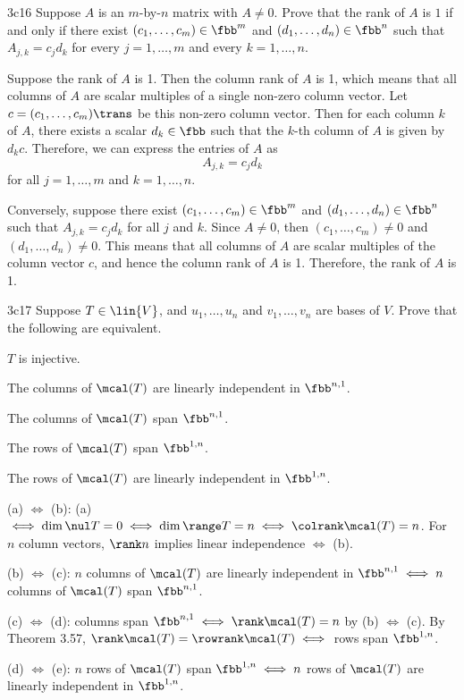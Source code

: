 \begin{exercise}{3c16}
    Suppose $A$ is an $m$-by-$n$ matrix with $A \neq 0$.
	Prove that the rank of $A$ is $1$ if and only if there exist $(c_1, \ldots, c_m) \in \fbb^m$ and $(d_1, \ldots, d_n) \in \fbb^n$ such that $A_{j, k} = c_j d_k$ for every $j = 1, \ldots, m$ and every $k = 1, \ldots, n$.
\end{exercise}

\begin{sol}
    Suppose the rank of $A$ is 1.
	Then the column rank of $A$ is 1, which means that all columns of $A$ are scalar multiples of a single non-zero column vector.
	Let $c = (c_1, \ldots, c_m)\trans$ be this non-zero column vector.
	Then for each column $k$ of $A$, there exists a scalar $d_k \in \fbb$ such that the $k$-th column of $A$ is given by $d_k c$.
	Therefore, we can express the entries of $A$ as
    \[
    	A_{j, k} = c_j d_k
    \]
    for all $j = 1, \ldots, m$ and $k = 1, \ldots, n$.

    Conversely, suppose there exist $(c_1, \ldots, c_m) \in \fbb^m$ and $(d_1, \ldots, d_n) \in \fbb^n$ such that $A_{j, k} = c_j d_k$ for all $j$ and $k$.
	Since $A \neq 0$, then $(c_1, \ldots, c_m) \neq 0$ and $(d_1, \ldots, d_n) \neq 0$.
	This means that all columns of $A$ are scalar multiples of the column vector $c$, and hence the column rank of $A$ is 1.
	Therefore, the rank of $A$ is 1.
\end{sol}

\begin{exercise}{3c17}
    Suppose $T \in \lin{V}$, and $u_1, \ldots, u_n$ and $v_1, \ldots, v_n$ are bases of $V$.
	Prove that the following are equivalent.
    \begin{subexercises}
        \item $T$ is injective.
        \item The columns of $\mcal(T)$ are linearly independent in $\fbb^{n, 1}$.
        \item The columns of $\mcal(T)$ span $\fbb^{n, 1}$.
        \item The rows of $\mcal(T)$ span $\fbb^{1, n}$.
        \item The rows of $\mcal(T)$ are linearly independent in $\fbb^{1, n}$.
    \end{subexercises}
\end{exercise}

\begin{solitem}
    \item (a) $\iff$ (b): (a) $\iff \dim \nul T = 0 \iff \dim \range T = n \iff \colrank \mcal(T) = n$.
	For $n$ column vectors, $\rank n$ implies linear independence $\iff$ (b).
    \item (b) $\iff$ (c): $n$ columns of $\mcal(T)$ are linearly independent in $\fbb^{n, 1} \iff n$ columns of $\mcal(T)$ span $\fbb^{n, 1}$.
    \item (c) $\iff$ (d): columns span $\fbb^{n, 1} \iff \rank \mcal(T) = n$ by (b) $\iff$ (c).
	By Theorem 3.57, $\rank \mcal(T) = \rowrank \mcal(T) \iff$ rows span $\fbb^{1, n}$.
    \item (d) $\iff$ (e): $n$ rows of $\mcal(T)$ span $\fbb^{1, n} \iff n$ rows of $\mcal(T)$ are linearly independent in $\fbb^{1, n}$.
\end{solitem}